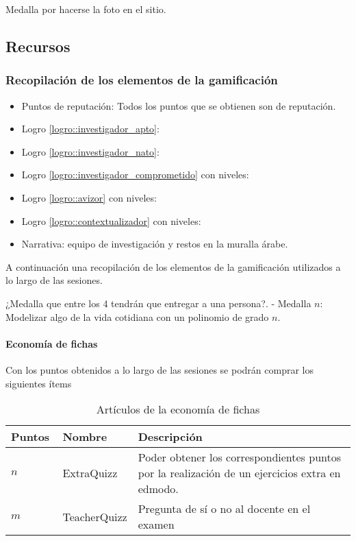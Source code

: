 Medalla por hacerse la foto en el sitio.


\subsection{Recursos}

\subsubsection{Recopilación de los elementos de la gamificación }

\begin{itemize}
	\item{} Puntos de reputación: Todos los puntos que se obtienen son de reputación.
	\item{} Logro \ref{logro::investigador_apto}:
	\item{} Logro \ref{logro::investigador_nato}:
	\item{} Logro \ref{logro::investigador_comprometido} con niveles:
	\item{} Logro \ref{logro::avizor} con niveles:
	\item{} Logro \ref{logro::contextualizador} con niveles:
	\item{} Narrativa: equipo de investigación y restos en la muralla árabe.
\end{itemize}


A continuación una recopilación de los elementos de la gamificación utilizados a lo largo de las sesiones.

¿Medalla que entre los 4 tendrán que entregar a una persona?. 
- Medalla $n$: Modelizar algo de la vida cotidiana con un polinomio de grado $n$.

\paragraph{Economía de fichas}
%
Con los puntos obtenidos a lo largo de las sesiones se podrán comprar los siguientes ítems

\begin{table}[hbt]
\centering
\caption{Artículos de la economía de fichas}
\label{tbl:tienda}
\begin{tabular}{|m{0.15\linewidth}|m{0.2\linewidth}|m{0.7\linewidth}|}
\hline
Puntos & Nombre & Descripción \\ \hline
$n$ & ExtraQuizz	& Poder obtener los correspondientes puntos por la realización de un ejercicios extra en edmodo.\\\hline
$m$ & TeacherQuizz & Pregunta de sí o no al docente en el examen\\\hline
\end{tabular}
\end{table}


